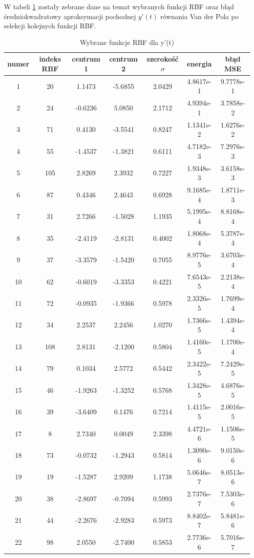 W tabeli \ref{tab:rbf_tabela_x2} zostały zebrane dane na temat wybranych funkcji RBF oraz błąd średniokwadratowy aproksymacji pochodnej $y'(t)$ równania Van der Pola po selekcji kolejnych funkcji RBF.

\begin{table}[ht!]
\centering

\begin{tabular}{ |c| c| c| c| c| c| c| }
\hline
numer & indeks RBF & centrum 1 & centrum 2 & szerokość $\sigma$ & energia      & błąd MSE    \\ \hline    
  1 &  20 &   1.1473 &  -5.6855 &   2.0429 &   4.8617e-1 & 9.7778e-1 \\
  2 &  24 &  -0.6236 &   5.0850 &   2.1712 &   4.9394e-1 & 3.7858e-2 \\
  3 &  71 &   0.4130 &  -3.5541 &   0.8247 &   1.1341e-2 & 1.6276e-2 \\
  4 &  55 &  -1.4537 &  -1.3821 &   0.6111 &   4.7182e-3 & 7.2976e-3 \\
  5 & 105 &   2.8269 &   2.3932 &   0.7227 &   1.9348e-3 & 3.6158e-3 \\
  6 &  87 &   0.4346 &   2.4643 &   0.6928 &   9.1685e-4 & 1.8711e-3 \\
  7 &  31 &   2.7266 &  -1.5028 &   1.1935 &   5.1995e-4 & 8.8168e-4 \\
  8 &  35 &  -2.4119 &  -2.8131 &   0.4002 &   1.8068e-4 & 5.3787e-4 \\
  9 &  37 &  -3.3579 &  -1.5420 &   0.7055 &   8.9776e-5 & 3.6703e-4 \\
 10 &  62 &  -0.6019 &  -3.3353 &   0.4221 &   7.6543e-5 & 2.2138e-4 \\
 11 &  72 &  -0.0935 &  -1.9366 &   0.5978 &   2.3326e-5 & 1.7699e-4 \\
 12 &  34 &   2.2537 &   2.2456 &   1.0270 &   1.7366e-5 & 1.4394e-4 \\
 13 & 108 &   2.8131 &  -2.1200 &   0.5804 &   1.4160e-5 & 1.1700e-4 \\
 14 &  79 &   0.1034 &   2.5772 &   0.5442 &   2.3422e-5 & 7.2429e-5 \\
 15 &  46 &  -1.9263 &  -1.3252 &   0.5768 &   1.3428e-5 & 4.6876e-5 \\
 16 &  39 &  -3.6409 &   0.1476 &   0.7214 &   1.4115e-5 & 2.0016e-5 \\
 17 &   8 &   2.7340 &   0.0049 &   2.3398 &   4.4721e-6 & 1.1506e-5 \\
 18 &  73 &  -0.0732 &  -1.2943 &   0.5814 &   1.3090e-6 & 9.0150e-6 \\
 19 &  19 &  -1.5287 &   2.9209 &   1.1738 &   5.0646e-7 & 8.0513e-6 \\
 20 &  38 &  -2.8697 &  -0.7094 &   0.5993 &   2.7376e-7 & 7.5303e-6 \\
 21 &  44 &  -2.2676 &  -2.9283 &   0.5973 &   8.8402e-7 & 5.8481e-6 \\
 22 &  98 &   2.0550 &  -2.7400 &   0.5853 &   2.7736e-6 & 5.7016e-7 \\
    \hline
\end{tabular}


\caption{Wybrane funkcje RBF dla y'(t)}
\label{tab:rbf_tabela_x2}
\end{table}

